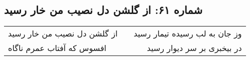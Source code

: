 \begin{center}
\section*{شماره ۶۱: از گلشن دل نصیب من خار رسید}
\label{sec:061}
\begin{longtable}{l p{0.5cm} r}
از گلشن دل نصیب من خار رسید
&&
وز جان به لب رسیده تیمار رسید
\\
افسوس که آفتاب عمرم ناگاه
&&
در بیخبری بر سر دیوار رسید
\\
\end{longtable}
\end{center}
